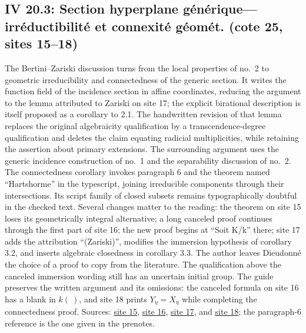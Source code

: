 \documentclass[10pt,a4paper]{article}
\begin{document}
\subsection*{IV 20.3: Section hyperplane générique---irréductibilité et connexité géomét. (cote 25, sites 15--18)}
The Bertini--Zariski discussion turns from the local properties of no.\ 2 to geometric irreducibility and connectedness of the generic section. It writes the function field of the incidence section in affine coordinates, reducing the argument to the lemma attributed to Zariski on site 17; the explicit birational description is itself proposed as a corollary to 2.1. The handwritten revision of that lemma replaces the original algebraicity qualification by a transcendence-degree qualification and deletes the claim equating radicial multiplicities, while retaining the assertion about primary extensions. The surrounding argument uses the generic incidence construction of no.\ 1 and the separability discussion of no.\ 2. The connectedness corollary invokes paragraph 6 and the theorem named ``Hartshorme'' in the typescript, joining irreducible components through their intersections. Its script family of closed subsets remains typographically doubtful in the checked text. Several changes matter to the reading: the theorem on site 15 loses its geometrically integral alternative; a long canceled proof continues through the first part of site 16; the new proof begins at ``Soit K/k'' there; site 17 adds the attribution ``(Zariski)'', modifies the immersion hypothesis of corollary 3.2, and inserts algebraic closedness in corollary 3.3. The author leaves Dieudonné the choice of a proof to copy from the literature. The qualification above the canceled immersion wording still has an uncertain initial group. The guide preserves the written argument and its omissions: the canceled formula on site 16 has a blank in $k(\ )$, and site 18 prints $Y_\eta=X_\eta$ while completing the connectedness proof. Sources: \href{https://grothendieck.umontpellier.fr/web/viewer.html?file=../25.pdf\#page=16}{site 15}, \href{https://grothendieck.umontpellier.fr/web/viewer.html?file=../25.pdf\#page=17}{site 16}, \href{https://grothendieck.umontpellier.fr/web/viewer.html?file=../25.pdf\#page=18}{site 17}, and \href{https://grothendieck.umontpellier.fr/web/viewer.html?file=../25.pdf\#page=19}{site 18}; the paragraph-6 reference is the one given in the prenotes.
\par{}

\par{}
\end{document}
